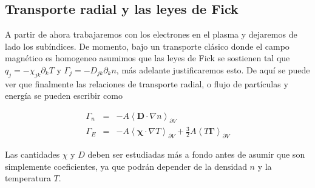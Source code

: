 \subsection{Transporte radial y las leyes de Fick}

A partir de ahora trabajaremos con los electrones en el plasma y dejaremos de lado los sub\'indices. De momento, bajo un transporte cl\'asico donde el campo magn\'etico es homogeneo asumimos que las leyes de Fick se sostienen tal que $q_j = -\chi_{jk}\partial_k T$ y $\Gamma_j = -D_{jk}\partial_k n$, m\'as adelante justificaremos esto. De aqu\'i se puede ver que finalmente las relaciones de transporte radial, o flujo de part\'iculas y energ\'ia se pueden escribir como

  \begin{eqnarray}
    \Gamma_n &=& -A\left<\textbf{D}\cdot\nabla n\right>_{\partial V} \label{eq:partflux}\\
    \Gamma_E &=& -A\left<\pmb{\chi}\cdot\nabla T\right>_{\partial V} + \frac{3}{2}A\left<T\pmb{\Gamma}\right>_{\partial V}\label{eq:energyflux}
    \end{eqnarray}
    
  Las cantidades $\chi$ y $D$ deben ser estudiadas m\'as a fondo antes de asumir que son simplemente coeficientes, ya que podr\'an depender de la densidad $n$ y la temperatura $T$.

